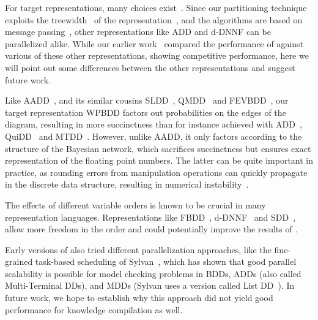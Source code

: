 For target representations, many choices exist~\cite{darwiche2001decomposable,darwiche2011sdd,darwiche2002knowledge,fargier2014knowledge}. Since our partitioning technique exploits the treewidth~\cite{dechter1998bucket} of the representation~\cite[\S 5]{dal2021compositional}, and the algorithms are based on message passing~\cite[\S 4]{dal2021compositional}, other representations like ADD and d-DNNF can be parallelized alike. While our earlier work~\cite{dal2018parallel} compared the performance of \toolname against various of these other representations, showing competitive performance, here we will point out some differences between the other representations and suggest future work.


Like AADD~\cite{sanner2005affine}, and its similar cousins SLDD~\cite{wilson2005decision}, QMDD~\cite{miller2006qmdd} and FEVBDD~\cite{tafertshofer1997factored}, our target representation WPBDD factors out probabilities on the edges of the diagram, resulting in more succinctness than for instance achieved with ADD~\cite{bahar}, QuiDD~\cite{viamontes2003improving} and MTDD~\cite{Clarke2001}. However, unlike AADD, it only factors according to the structure of the Bayesian network, which sacrifices succinctness but ensures exact representation of the floating point numbers. The latter can be quite important in practice, as rounding errors from manipulation operations can quickly propagate in the discrete data structure, resulting in numerical instability~\cite{zulehner2019efficiently}.

The effects of different variable orders is known to be crucial in many representation languages. Representations like FBDD~\cite{wegener2000branching}, d-DNNF~\cite{chavira2006compiling} and SDD~\cite{darwiche2011sdd}, allow more freedom in the order and could potentially improve the results of \toolname.

Early versions of \toolname also tried different parallelization approaches, like the fine-grained task-based scheduling of Sylvan~\cite{van2013multi}, which has shown that good parallel scalability is possible for model checking problems in BDDs, ADDs (also called Multi-Terminal DDs), and MDDs (Sylvan uses a version called List DD~\cite{sylvan-journal}). In future work, we hope to establish why this approach did not yield good performance for knowledge compilation as well.





